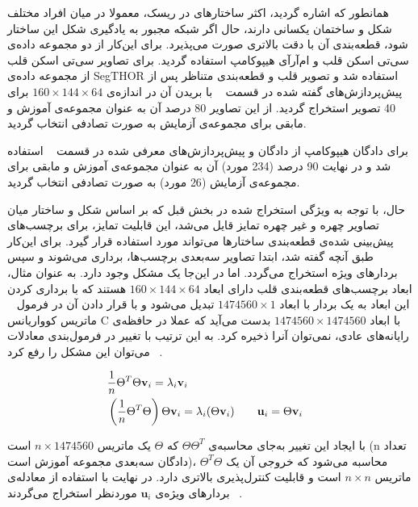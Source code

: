 
همانطور که اشاره گردید، اکثر ساختارهای در ریسک، معمولا در میان افراد مختلف شکل و ساختمان یکسانی دارند، حال اگر شبکه مجبور به یادگیری شکل این ساختار شود، قطعه‌بندی آن با دقت بالاتری صورت می‌پذیرد. برای این‌کار از دو مجموعه‌ داده‌ی سی‌تی اسکن قلب و ام‌آرآی هیپوکامپ استفاده گردید. برای تصاویر سی‌تی اسکن قلب از مجموعه داده‌ی SegTHOR استفاده شد و تصویر قلب و قطعه‌بندی متناظر پس از پیش‌پردازش‌های گفته شده در قسمت ~ با بریدن آن در اندازه‌ی $160\times144\times64$ برای 40 تصویر استخراج گردید. از این تصاویر 80 درصد آن به عنوان مجموعه‌ی آموزش و مابقی برای مجموعه‌ی آزمایش به صورت تصادفی انتخاب گردید. 

برای دادگان هیپوکامپ از دادگان و پیش‌پردازش‌های معرفی شده در قسمت ~ استفاده شد و در نهایت 90 درصد (234 مورد) آن به عنوان مجموعه‌ی آموزش و مابقی برای مجموعه‌ی آزمایش (26 مورد) به صورت تصادفی انتخاب گردید. 

حال، با توجه به ویژگی استخراج شده در بخش قبل که بر اساس شکل و ساختار میان تصاویر چهره و غیر چهره تمایز قایل می‌شد، این قابلیت تمایز، برای برچسب‌های پیش‌بینی شده‌ی قطعه‌بندی ساختارها می‌تواند مورد استفاده قرار گیرد. برای این‌کار طبق آنچه‌ گفته شد، ابتدا تصاویر سه‌بعدی برچسب‌ها، برداری می‌شوند و سپس بردار‌های ویژه استخراج می‌گردد. اما در این‌جا یک مشکل وجود دارد. به عنوان مثال، ابعاد برچسب‌های قطعه‌بندی قلب دارای ابعاد $160\times144\times64$ هستند که با برداری کردن این ابعاد به یک بردار با ابعاد $1474560\times1$ تبدیل می‌شود و با قرار دادن آن در فرمول ~ ماتریس کوواریانس C با ابعاد $1474560\times1474560$ بدست می‌آید که عملا در حافظه‌ی رایانه‌های عادی، نمی‌توان آنرا ذخیره کرد. به این ترتیب با تغییر در فرمول‌بندی معادلات ~ می‌توان این مشکل را رفع کرد.

\begin{alignat}{5}
	&\frac{1}{n}\Theta^T\Theta\mathbf{v}_i=\lambda_i\mathbf{v}_i     \notag && \\
	&\left(\frac{1}{n}\Theta^T\Theta\right)\Theta\mathbf{v}_i=\lambda_i(\Theta\mathbf{v}_i) \qquad \mathbf{u}_i = \Theta\mathbf{v}_i \label{modifpca} && 
\end{alignat}

با ایجاد این تغییر به‌جای محاسبه‌ی $\Theta\Theta^T$ که $\Theta$ یک ماتریس $n \times 1474560$ است (n تعداد دادگان سه‌بعدی مجموعه آموزش است)، $\Theta^T\Theta$ محاسبه می‌شود که خروجی آن یک ماتریس $n\times n$ است و قابلیت کنترل‌پذیری بالاتری دارد. در نهایت با استفاده از معادله‌ی ~ بردارهای ویژه‌ی $\mathbf{u}_i$ موردنظر استخراج می‌گردند.

